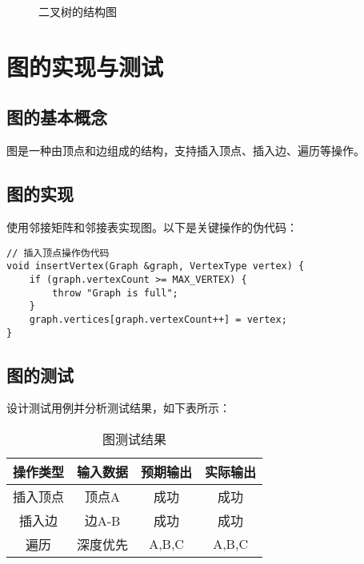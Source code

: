 \documentclass{article}
\begin{document}
\begin{figure}
\centering
{}
\caption{二叉树的结构图}
\label{fig:binary_tree}
\end{figure}

\section{图的实现与测试}
\subsection{图的基本概念}
图是一种由顶点和边组成的结构，支持插入顶点、插入边、遍历等操作。

\subsection{图的实现}
使用邻接矩阵和邻接表实现图。以下是关键操作的伪代码：

\begin{verbatim}
// 插入顶点操作伪代码
void insertVertex(Graph &graph, VertexType vertex) {
    if (graph.vertexCount >= MAX_VERTEX) {
        throw "Graph is full";
    }
    graph.vertices[graph.vertexCount++] = vertex;
}
\end{verbatim}

\subsection{图的测试}
设计测试用例并分析测试结果，如下表所示：

\begin{table}
\centering
\begin{tabular}{|c|c|c|c|}
\hline
操作类型 & 输入数据 & 预期输出 & 实际输出 \\ \hline
插入顶点 & 顶点A & 成功 & 成功 \\ \hline
插入边 & 边A-B & 成功 & 成功 \\ \hline
遍历 & 深度优先 & A,B,C & A,B,C \\ \hline
\end{tabular}
\caption{图测试结果}
\label{tab:graph_test}
\end{table}
\end{document}
